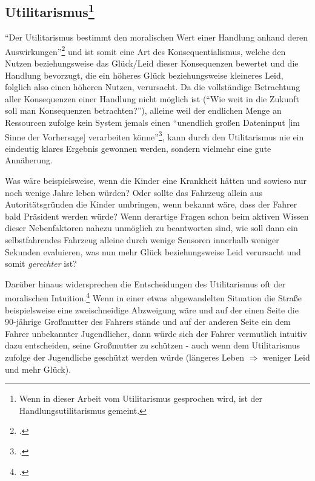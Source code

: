 \documentclass[a4paper, 12pt, openany]{book}
\begin{document}
            \subsection{Utilitarismus\footnote{Wenn in dieser Arbeit vom Utilitarismus gesprochen wird, ist der Handlungsutilitarismus gemeint.}}
                \enquote{Der Utilitarismus bestimmt den moralischen Wert einer Handlung anhand deren Auswirkungen}\footcite[221]{scholz2016autonomes} und ist somit eine Art des Konsequentialismus, welche den Nutzen beziehungsweise das Glück/Leid dieser Konsequenzen bewertet und die Handlung bevorzugt, die ein höheres Glück beziehungsweise kleineres Leid, folglich also einen höheren Nutzen, verursacht. Da die vollständige Betrachtung aller Konsequenzen einer Handlung nicht möglich ist (\enquote{Wie weit in die Zukunft soll man Konsequenzen betrachten?}), alleine weil der endlichen Menge an Ressourcen zufolge kein System jemals einen \enquote{unendlich großen Dateninput [im Sinne der Vorhersage] verarbeiten könne}\footcite[221]{scholz2016autonomes}, kann durch den Utilitarismus nie ein eindeutig klares Ergebnis gewonnen werden, sondern vielmehr eine gute Annäherung.\par
                Was wäre beispielsweise, wenn die Kinder eine Krankheit hätten und sowieso nur noch wenige Jahre leben würden? Oder sollte das Fahrzeug allein aus Autoritätsgründen die Kinder umbringen, wenn bekannt wäre, dass der Fahrer bald Präsident werden würde? Wenn derartige Fragen schon beim aktiven Wissen dieser Nebenfaktoren nahezu unmöglich zu beantworten sind, wie soll dann ein selbstfahrendes Fahrzeug alleine durch wenige Sensoren innerhalb weniger Sekunden evaluieren, was nun mehr Glück beziehungsweise Leid verursacht und somit \textit{gerechter} ist?\par
                Darüber hinaus widersprechen die Entscheidungen des Utilitarismus oft der moralischen Intuition.\footcite[221]{scholz2016autonomes} Wenn in einer etwas abgewandelten Situation die Straße beispielsweise eine zweischneidige Abzweigung wäre und auf der einen Seite die 90-jährige Großmutter des Fahrers stände und auf der anderen Seite ein dem Fahrer unbekannter Jugendlicher, dann würde sich der Fahrer vermutlich intuitiv dazu entscheiden, seine Großmutter zu schützen - auch wenn dem Utilitarismus zufolge der Jugendliche geschützt werden würde (längeres Leben $\Rightarrow$ weniger Leid und mehr Glück).
                
\end{document}
